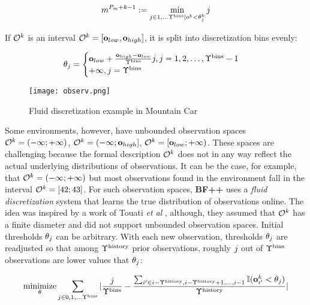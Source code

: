 \begin{equation}
\label{eq:discretization}
m^{P_m+k-1} := \min_{j \in 1,\dots \Upsilon^\text{bins} | o^k < \theta^k_j} j
\end{equation}

If $\mathcal{O}^k$ is an interval $\mathcal{O}^k=[\mathbf{o}_{low}, \mathbf{o}_{high}]$, it is split into discretization bins evenly:

\begin{equation}
\label{eq:static-thresholds}
\theta_j = \begin{cases}
\mathbf{o}_{low}+\frac{\mathbf{o}_{high}-\mathbf{o}_{low}}{\Upsilon^\text{bins}}j, j=1,2,\dots,\Upsilon^\text{bins}-1 \\
+\infty, j=\Upsilon^\text{bins} 
\end{cases}
\end{equation}

\begin{figure}
    \centering
    \texttt{[image: observ.png]}
    \caption{Fluid discretization example in Mountain Car}
    \label{fig:obs}
\end{figure}

Some environments, however, have unbounded observation spaces $\mathcal{O}^k=(-\infty;+\infty)$, $\mathcal{O}^k=(-\infty;\mathbf{o}_{high}]$,  $\mathcal{O}^k=[\mathbf{o}_{low};+\infty)$.
These spaces are challenging because the formal description $\mathcal{O}^k$ does not in any way reflect the actual underlying distributions of observations.
It can be the case, for example, that $\mathcal{O}^k=(-\infty;+\infty)$ but most observations found in the environment fall in the interval $\mathcal{O}^k=[42;43]$.
For such observation spaces, \textbf{BF++} uses a \textit{fluid discretization} system that learns the true distribution of observations online. The idea was inspired by a work of Touati {\sl et al} \cite{adaptivediscretization}, although, they assumed that $\mathcal{O}^k$ has a finite diameter and did not support unbounded observation spaces.
Initial thresholds $\theta_j$ can be arbitrary.
With each new observation, thresholds $\theta_j$ are readjusted so that among $\Upsilon^\text{history}$ prior observations, roughly $j$ out of $\Upsilon^\text{bins}$  observations are lower values that $\theta_j$:

\begin{equation}
\underset{\theta}{\text{minimize}} \sum_{j \in 0,1,\dots \Upsilon^\text{bins}} |\frac{j}{\Upsilon^\text{bins}} - \frac{\sum_{i' \in i-\Upsilon^\text{history},i-\Upsilon^\text{history}+1,\dots,i-1} \mathbb{I} (\mathbf{o}_{i'}^k < \theta_j)}{\Upsilon^\text{history}}|
\end{equation}

